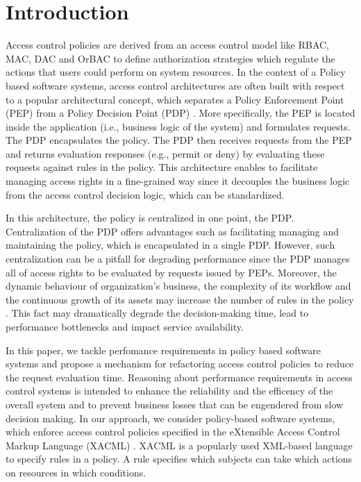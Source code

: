 
\section{Introduction} \label{sec:introduction}

Access control policies are derived from an access control model like RBAC, MAC, DAC and OrBAC \cite{dac,mac,rbac,orbac} to define authorization strategies which regulate the actions 
that users could perform on system resources. In the context of a Policy based software systems, access control architectures are often built with respect to a popular architectural 
concept, which separates a Policy Enforcement Point (PEP) from a Policy Decision Point (PDP) \cite{separation}. More specifically, the PEP is located inside 
the application (i.e., business logic of the system) and formulates requests.
The PDP encapsulates the policy. The PDP then receives requests from the PEP and returns evaluation responses (e.g., permit or deny) by evaluating these requests 
against rules in the policy. This architecture enables to facilitate managing access rights in a fine-grained way since it 
decouples the business logic from the access control decision logic, which can be standardized. 

In this architecture, the policy is centralized in one point, the PDP. Centralization of the PDP offers advantages such as facilitating managing and maintaining the policy, 
which is encapsulated in a single PDP. However, such centralization can be a pitfall for degrading performance since the PDP manages all of access rights to be evaluated by 
requests issued by PEPs. Moreover, the dynamic behaviour of organization's business, the complexity of its workflow and the continuous growth of its assets may increase the 
number of rules in the policy \cite{policymanagement}. This fact may dramatically degrade the decision-making time, lead to performance bottlenecks and impact service availability.

In this paper, we tackle perfomance requirements in policy based software systems and propose a mechanism for refactoring access control policies to reduce
the request evaluation time. Reasoning about performance requirements in access control systems is intended to enhance the reliability and the efficency of the overall system 
and to prevent business losses that can be engendered from slow decision making. In our approach, we consider policy-based software systems, which
enforce access control policies specified in the eXtensible Access Control Markup Language (XACML) \cite{sunxacml}. XACML is a popularly used XML-based language to specify rules 
in a policy. A rule specifies which subjects can take which actions on resources in which conditions.

